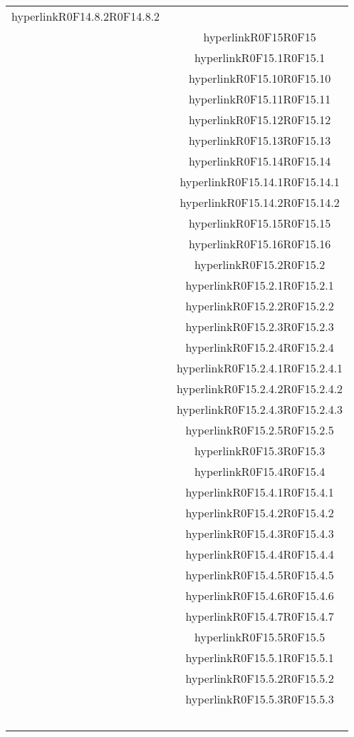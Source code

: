 \documentclass[../AnalisiDeiRequisiti.tex]{subfiles}
\begin{document}
\begin{longtable}{|c|c|}
	hyperlink{R0F14.8.2}{R0F14.8.2}\\& \
	hyperlink{R0F15}{R0F15}\\& \
	hyperlink{R0F15.1}{R0F15.1}\\& \
	hyperlink{R0F15.10}{R0F15.10}\\& \
	hyperlink{R0F15.11}{R0F15.11}\\& \
	hyperlink{R0F15.12}{R0F15.12}\\& \
	hyperlink{R0F15.13}{R0F15.13}\\& \
	hyperlink{R0F15.14}{R0F15.14}\\& \
	hyperlink{R0F15.14.1}{R0F15.14.1}\\& \
	hyperlink{R0F15.14.2}{R0F15.14.2}\\& \
	hyperlink{R0F15.15}{R0F15.15}\\& \
	hyperlink{R0F15.16}{R0F15.16}\\& \
	hyperlink{R0F15.2}{R0F15.2}\\& \
	hyperlink{R0F15.2.1}{R0F15.2.1}\\& \
	hyperlink{R0F15.2.2}{R0F15.2.2}\\& \
	hyperlink{R0F15.2.3}{R0F15.2.3}\\& \
	hyperlink{R0F15.2.4}{R0F15.2.4}\\& \
	hyperlink{R0F15.2.4.1}{R0F15.2.4.1}\\& \
	hyperlink{R0F15.2.4.2}{R0F15.2.4.2}\\& \
	hyperlink{R0F15.2.4.3}{R0F15.2.4.3}\\& \
	hyperlink{R0F15.2.5}{R0F15.2.5}\\& \
	hyperlink{R0F15.3}{R0F15.3}\\& \
	hyperlink{R0F15.4}{R0F15.4}\\& \
	hyperlink{R0F15.4.1}{R0F15.4.1}\\& \
	hyperlink{R0F15.4.2}{R0F15.4.2}\\& \
	hyperlink{R0F15.4.3}{R0F15.4.3}\\& \
	hyperlink{R0F15.4.4}{R0F15.4.4}\\& \
	hyperlink{R0F15.4.5}{R0F15.4.5}\\& \
	hyperlink{R0F15.4.6}{R0F15.4.6}\\& \
	hyperlink{R0F15.4.7}{R0F15.4.7}\\& \
	hyperlink{R0F15.5}{R0F15.5}\\& \
	hyperlink{R0F15.5.1}{R0F15.5.1}\\& \
	hyperlink{R0F15.5.2}{R0F15.5.2}\\& \
	hyperlink{R0F15.5.3}{R0F15.5.3}\\& \

\end{longtable}
\end{document}
